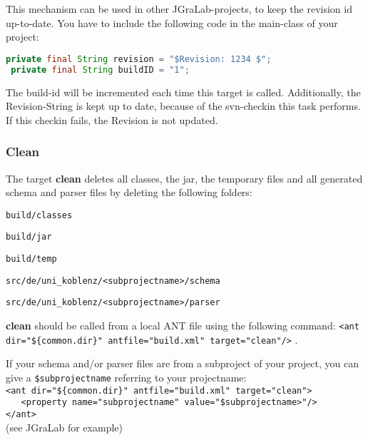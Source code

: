 \documentclass
[
		a4paper,
		twoside, 										
		BCOR10mm,											
		11pt,												
		halfparskip,								
		bigheadings,								
		notitlepage,			
		pdftex											
]
{scrartcl}
\begin{document}
This mechanism can be used in other JGraLab-projects, to keep the revision id up-to-date.
You have to include the following code in the main-class of your project:

\begin{lstlisting}[language = java]
 private final String revision = "$Revision: 1234 $";
 private final String buildID = "1";
\end{lstlisting}

The build-id will be incremented each time this target is called. Additionally, the Revision-String is kept up to date, because of the svn-checkin this task performs. If this checkin fails, the Revision is not updated.


\subsubsection{Clean}
\label{Clean}

The target \textbf{clean} deletes all classes, the jar, the temporary files and all generated schema and parser files by deleting the following folders:
\footnotesize
\begin{compactitem}
	\item \texttt{build/classes}
	\item \texttt{build/jar}
	\item \texttt{build/temp}	
	\item \texttt{src/de/uni\_koblenz/<subprojectname>/schema}
	\item \texttt{src/de/uni\_koblenz/<subprojectname>/parser}
\end{compactitem}
\normalsize

\textbf{clean} should be called from a local ANT file using the following command: 
\footnotesize
\verb|<ant dir="${common.dir}" antfile="build.xml" target="clean"/>|
\normalsize.

If your schema and/or parser files are from a subproject of your project, you can give a \texttt{\$subprojectname} referring to your projectname:\\
\footnotesize
\verb|<ant dir="${common.dir}" antfile="build.xml" target="clean">|\\ \verb|   <property name="subprojectname" value="$subprojectname>"/>|\\ \verb|</ant>|
\normalsize\\
(see JGraLab for example)


\end{document}
